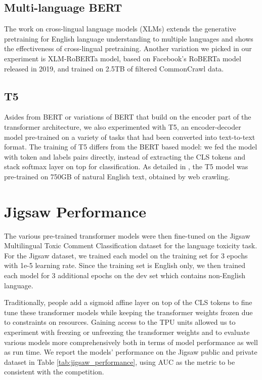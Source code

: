 \documentclass[11pt,a4paper]{article}
\begin{document}
\subsection{Multi-language BERT}
The work on cross-lingual language models (XLMs) extends the generative pretraining for English language understanding to multiple languages and shows the effectiveness of cross-lingual pretraining. Another variation we picked in our experiment is XLM-RoBERTa model, based on Facebook’s RoBERTa model released in 2019, and trained on 2.5TB of filtered CommonCrawl data. 

\subsection{T5}
Asides from BERT or variations of BERT that build on the encoder part of the transformer architecture, we also experimented with T5, an encoder-decoder model pre-trained on a variety of tasks that had been converted into text-to-text format. The training of T5 differs from the BERT based model: we fed the model with token and labels pairs directly, instead of extracting the CLS tokens and stack softmax layer on top for classification. As detailed in \citep{raffel2019exploring}, the T5 model was pre-trained on 750GB of natural English text, obtained by web crawling.


\section{Jigsaw Performance}
The various pre-trained transformer models were then fine-tuned on the Jigsaw Multilingual Toxic Comment Classification dataset for the language toxicity task. For the Jigsaw dataset, we trained each model on the training set for 3 epochs with 1e-5 learning rate. Since the training set is English only, we then trained each model for 3 additional epochs on the dev set which contains non-English language. 

Traditionally, people add a sigmoid affine layer on top of the CLS tokens to fine tune these transformer models while keeping the transformer weights frozen due to constraints on resources. Gaining access to the TPU units allowed us to experiment with freezing or unfreezing the transformer weights and to evaluate various models more comprehensively both in terms of model performance as well as run time. We report the models' performance on the Jigsaw public and private dataset in Table \ref{tab:jigsaw_performance}, using AUC as the metric to be consistent with the competition. 
\end{document}
